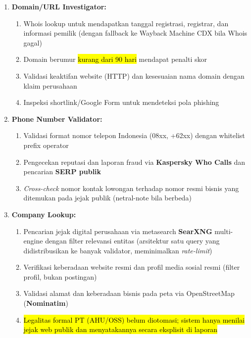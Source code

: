 \documentclass[12pt,a4paper]{article}
\newcommand{\revisi}[1]{\hl{#1}}
\begin{document}
\begin{enumerate}[label=\textbf{\alph*.}, leftmargin=*, labelindent=0.65cm, labelsep=0.5em]
\item \textbf{Domain/URL Investigator:}
\begin{enumerate}[label=\textbf{\arabic*)}, leftmargin=*, labelindent=0.50cm, labelsep=0.5em]
\item Whois lookup untuk mendapatkan tanggal registrasi, registrar, dan informasi pemilik (dengan fallback ke Wayback Machine CDX bila Whois gagal)
\item Domain berumur \revisi{kurang dari 90 hari} mendapat penalti skor
\item Validasi keaktifan website (HTTP) dan kesesuaian nama domain dengan klaim perusahaan
\item Inspeksi shortlink/Google Form untuk mendeteksi pola phishing
\end{enumerate}

\item \textbf{Phone Number Validator:}
\begin{enumerate}[label=\textbf{\arabic*)}, leftmargin=*, labelindent=0.50cm, labelsep=0.5em]
\item Validasi format nomor telepon Indonesia (08xx, +62xx) dengan whitelist prefix operator
\item Pengecekan reputasi dan laporan fraud via \textbf{Kaspersky Who Calls} dan pencarian \textbf{SERP publik}
\item \textit{Cross-check} nomor kontak lowongan terhadap nomor resmi bisnis yang ditemukan pada jejak publik (netral-note bila berbeda)
\end{enumerate}

\item \textbf{Company Lookup:}
\begin{enumerate}[label=\textbf{\arabic*)}, leftmargin=*, labelindent=0.50cm, labelsep=0.5em]
\item Pencarian jejak digital perusahaan via metasearch \textbf{SearXNG} multi-engine dengan filter relevansi entitas (arsitektur satu query yang didistribusikan ke banyak validator, meminimalkan \textit{rate-limit})
\item Verifikasi keberadaan website resmi dan profil media sosial resmi (filter profil, bukan postingan)
\item Validasi alamat dan keberadaan bisnis pada peta via OpenStreetMap (\textbf{Nominatim})
\item \revisi{Legalitas formal PT (AHU/OSS) belum diotomasi; sistem hanya menilai jejak web publik dan menyatakannya secara eksplisit di laporan}
\end{enumerate}
\end{enumerate}
\end{document}
